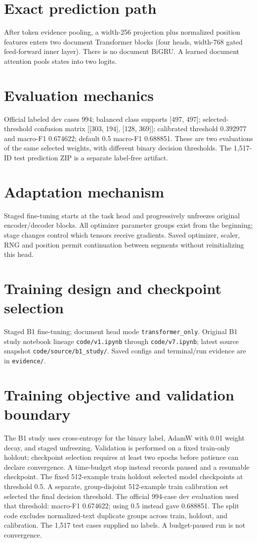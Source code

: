 \documentclass[11pt,a4paper]{article}
\begin{document}
\section{Exact prediction path}
After token evidence pooling, a width-256 projection plus normalized position features enters two document Transformer blocks (four heads, width-768 gated feed-forward inner layer). There is no document BiGRU. A learned document attention pools states into two logits.
\section{Evaluation mechanics}
Official labeled dev cases 994; balanced class supports [497, 497]; selected-threshold confusion matrix [[303, 194], [128, 369]]; calibrated threshold 0.392977 and macro-F1 0.674622; default 0.5 macro-F1 0.688851. These are two evaluations of the same selected weights, with different binary decision thresholds. The 1,517-ID test prediction ZIP is a separate label-free artifact.
\section{Adaptation mechanism}
Staged fine-tuning starts at the task head and progressively unfreezes original encoder/decoder blocks. All optimizer parameter groups exist from the beginning; stage changes control which tensors receive gradients. Saved optimizer, scaler, RNG and position permit continuation between segments without reinitializing this head.
\section{Training design and checkpoint selection}
Staged B1 fine-tuning; document head mode \texttt{transformer\_only}. Original B1 study notebook lineage \texttt{code/v1.ipynb} through \texttt{code/v7.ipynb}; latest source snapshot \texttt{code/source/b1\_study/}. Saved configs and terminal/run evidence are in \texttt{evidence/}.
\section{Training objective and validation boundary}
The B1 study uses cross-entropy for the binary label, AdamW with 0.01 weight decay, and staged unfreezing. Validation is performed on a fixed train-only holdout; checkpoint selection requires at least two epochs before patience can declare convergence. A time-budget stop instead records paused and a resumable checkpoint. The fixed 512-example train holdout selected model checkpoints at threshold 0.5. A separate, group-disjoint 512-example train calibration set selected the final decision threshold. The official 994-case dev evaluation used that threshold: macro-F1 0.674622; using 0.5 instead gave 0.688851. The split code excludes normalized-text duplicate groups across train, holdout, and calibration. The 1,517 test cases supplied no labels. A budget-paused run is not convergence.
\end{document}
